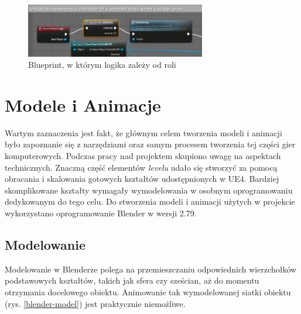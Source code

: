 \documentclass[multip]{SGGW-thesis}
\begin{document}
\begin{figure}
		\centering
			\includegraphics[width=0.7\textwidth]{figures/switchhasauth.jpg}
		\caption{Blueprint, w którym logika zależy od roli}
		\label{switch-has-authority}
\end{figure}

\section{Modele i Animacje }
Wartym zaznaczenia jest fakt, że głównym celem tworzenia modeli i animacji było zapoznanie się z narzędziami oraz samym procesem tworzenia tej części gier komputerowych. Podczas pracy nad projektem skupiono uwagę na aspektach technicznych. Znaczną część elementów {\em levelu} udało się stworzyć za pomocą obracania i skalowania gotowych kształtów udostępnionych w UE4. Bardziej skomplikowane kształty wymagały wymodelowania w osobnym oprogramowaniu dedykowanym do tego celu. Do stworzenia modeli i animacji użytych w projekcie wykorzystano oprogramowanie Blender w wersji 2.79.

	\subsection{Modelowanie}
Modelowanie w Blenderze polega na przemieszczaniu odpowiednich wierzchołków podstawowych kształtów, takich jak sfera czy sześcian, aż do momentu otrzymania docelowego obiektu. Animowanie tak wymodelowanej siatki obiektu (rys. \ref{blender-model}) jest praktycznie niemożliwe.
\end{document}
